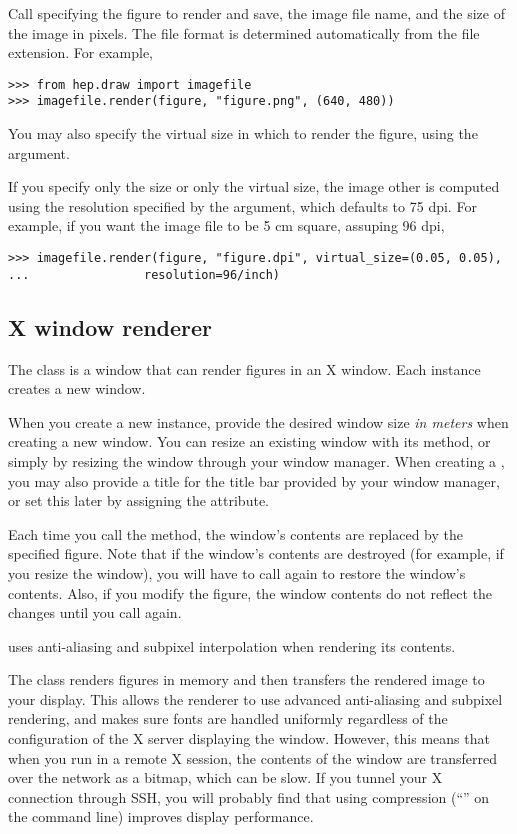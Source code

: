 Call  specifying the figure to render and save, the image
file name, and the size of the image in pixels.  The file format is
determined automatically from the file extension.  For example,
\begin{verbatim}
>>> from hep.draw import imagefile
>>> imagefile.render(figure, "figure.png", (640, 480))
\end{verbatim}
You may also specify the virtual size in which to render the figure,
using the  argument.

If you specify only the size or only the virtual size, the image other
is computed using the resolution specified by the 
argument, which defaults to 75 dpi.  For example, if you want the image
file to be 5 cm square, assuping 96 dpi,
\begin{verbatim}
>>> imagefile.render(figure, "figure.dpi", virtual_size=(0.05, 0.05),
...                resolution=96/inch)
\end{verbatim}

\subsection{X window renderer}

The class  is a window that can render
figures in an X window.  Each instance creates a new window.  

When you create a new  instance, provide the desired
window size \textit{in meters} when creating a new window.  You can
resize an existing window with its  method, or simply by
resizing the window through your window manager.  When creating a
, you may also provide a title for the title bar provided
by your window manager, or set this later by assigning the
 attribute.

Each time you call the  method, the window's contents are
replaced by the specified figure.  Note that if the window's contents
are destroyed (for example, if you resize the window), you will have to
call  again to restore the window's contents.  Also, if
you modify the figure, the window contents do not reflect the changes
until you call  again.

 uses anti-aliasing and subpixel interpolation when
rendering its contents.

The  class renders figures in memory and then transfers
the rendered image to your display.  This allows the renderer to use
advanced anti-aliasing and subpixel rendering, and makes sure fonts are
handled uniformly regardless of the configuration of the X server
displaying the window.  However, this means that when you run \pyhep in
a remote X session, the contents of the window are transferred over the
network as a bitmap, which can be slow.  If you tunnel your X connection
through SSH, you will probably find that using compression
(``'' on the  command line) improves display
performance.

